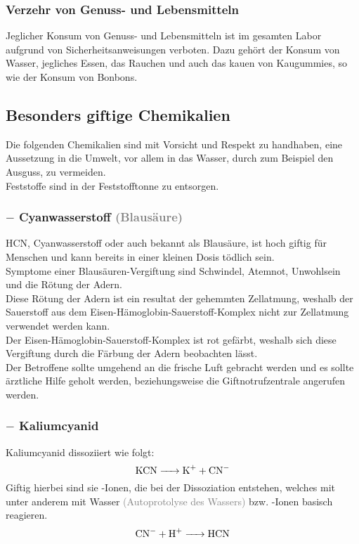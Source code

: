 \documentclass{article}
\begin{document}
\subsubsection{Verzehr von Genuss- und Lebensmitteln}
Jeglicher Konsum von Genuss- und Lebensmitteln ist im gesamten Labor aufgrund von Sicherheitsanweisungen verboten. Dazu gehört der Konsum von Wasser, jegliches Essen, das Rauchen und auch das kauen von Kaugummies, so wie der Konsum von Bonbons.

\newpage

\subsection{Besonders giftige Chemikalien}
Die folgenden Chemikalien sind mit Vorsicht und Respekt zu handhaben, eine Aussetzung in die Umwelt, vor allem in das Wasser, durch zum Beispiel den Ausguss, zu vermeiden.\\
Feststoffe sind in der Feststofftonne zu entsorgen.


\subsubsection{ $-$ Cyanwasserstoff \textcolor{gray}{(Blausäure)}}
HCN, Cyanwasserstoff oder auch bekannt als Blausäure, ist hoch giftig für Menschen und kann bereits in einer kleinen Dosis tödlich sein.\\
Symptome einer Blausäuren-Vergiftung sind Schwindel, Atemnot, Unwohlsein und die Rötung der Adern.\\
Diese Rötung der Adern ist ein resultat der gehemmten Zellatmung, weshalb der Sauerstoff aus dem Eisen-Hämoglobin-Sauerstoff-Komplex nicht zur Zellatmung verwendet werden kann.\\
Der Eisen-Hämoglobin-Sauerstoff-Komplex ist rot gefärbt, weshalb sich diese Vergiftung durch die Färbung der Adern beobachten lässt.\\
Der Betroffene sollte umgehend an die frische Luft gebracht werden und es sollte ärztliche Hilfe geholt werden,  beziehungsweise die Giftnotrufzentrale angerufen werden.\\

\subsubsection{ $-$ Kaliumcyanid}
Kaliumcyanid dissoziiert wie folgt:\\
\begin{equation}
    \ce{KCN -> K+ + CN-}
\end{equation}
Giftig hierbei sind sie -Ionen, die bei der Dissoziation entstehen, welches mit unter anderem mit Wasser \textcolor{gray}{(Autoprotolyse des Wassers)} bzw. -Ionen basisch reagieren.\\
\begin{equation}
    \ce{CN- + H+ -> HCN}
\end{equation}
\end{document}
